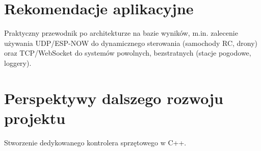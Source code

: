 \section{Rekomendacje aplikacyjne}
Praktyczny przewodnik po architekturze na bazie wyników, m.in. zalecenie używania UDP/ESP-NOW do dynamicznego sterowania (samochody RC, drony) oraz TCP/WebSocket do systemów powolnych, bezstratnych (stacje pogodowe, loggery).

\section{Perspektywy dalszego rozwoju projektu}
Stworzenie dedykowanego kontrolera sprzętowego w C++.

